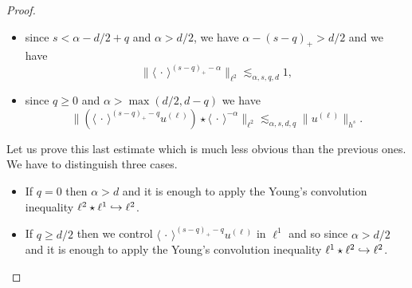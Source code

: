 \documentclass[11pt]{article}
\newcommand\hto{\mathrel{\lhook\joinrel\to}}
\theoremstyle{definition}
\begin{document}
\begin{proof}
\begin{itemize}
\item
since $s<\alpha -d/2+q$ and $\alpha > d/2$, we have $\alpha-(s-q)_+> d/2$ and we have
\[
\| \langle \, \cdot \, \rangle^{(s-q)_+-\alpha} \|_{\ell^2} \lesssim_{\alpha,s,q,d} 1,
\]

\item
since $q \geq 0$ and $\alpha> \max(d/2,d-q)$ we have
\[
\| (\langle \, \cdot\,\rangle^{(s-q)_+-q} u^{(\ell)}) \star \langle \, \cdot \, \rangle^{-\alpha} \|_{\ell^2} \lesssim_{\alpha,s,d,q}\| u^{(\ell)} \|_{h^s}.
\]
\end{itemize}
Let us prove this last estimate which is much less obvious than the previous ones. We have to distinguish three cases.
\begin{itemize}
\item
If $q=0$ then $\alpha>d$ and it is enough to apply the Young's convolution inequality $\ell^2 \star \ell^1 \hto \ell^2$.

\item
If $q\geq d/2$ then we control $\langle \, \cdot\,\rangle^{(s-q)_+-q} u^{(\ell)}$ in $\ell^1$ and so since $\alpha>d/2$ and it is enough to apply the Young's convolution inequality $\ell^1 \star \ell^2 \hto \ell^2$.


\end{itemize}
\end{proof}
\end{document}
